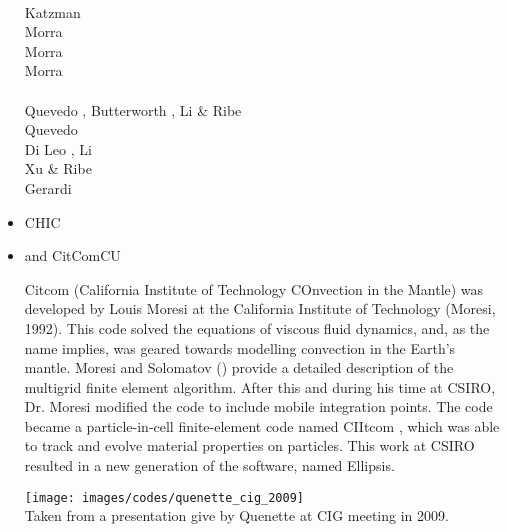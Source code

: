 \begin{itemize}
\begin{scriptsize}
\cite{crsr83}\\
Katzman \etal \cite{katl95}\\
Morra \etal \cite{moct07}\\
Morra \etal \cite{moct09}\\
Morra \etal \cite{moyb10}\\
\textcite{ribe10}\\
Quevedo \etal \cite{qumm12}, Butterworth \etal \cite{buqm12}, Li \& Ribe \cite{liri12}\\
Quevedo \etal \cite{quhm13}\\
Di Leo \etal \cite{diwl14}, Li \etal \cite{lidr14}\\
Xu \& Ribe \cite{xuri16}\\
Gerardi \etal \cite{gert19}
\end{scriptsize}

\item {\codefont CHIC}  

\begin{scriptsize}
\textcite{norv15}
\end{scriptsize}

\item \citcoms and {\codefont CitComCU} 

Citcom (California Institute of Technology COnvection in the Mantle) was  developed by Louis
Moresi at the California Institute of Technology (Moresi, 1992). This code solved the equations
of viscous fluid dynamics, and, as the name implies, was geared towards modelling convection in
the Earth's mantle. Moresi and Solomatov (\nineteenninetyfive) provide a detailed description of the multigrid
finite element algorithm. After this and during his time at CSIRO, Dr. Moresi modified the code to
include mobile integration points. The code became a particle-in-cell finite-element code named
CIItcom , which was able to track and evolve material properties on particles. This work at
CSIRO resulted in a new generation of the software, named Ellipsis.

\begin{center}
\texttt{[image: images/codes/quenette\_cig\_2009]}\\
{\captionfont Taken from a presentation give by Quenette at CIG meeting in 2009.}
\end{center}


\end{itemize}
